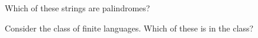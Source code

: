 \documentclass[noanswers, nolegalese, 11pt]{examjh}
\begin{document}
\begin{questions}
\question
Which of these strings are palindromes?

\question
Consider the class of finite languages.
Which of these is in the class?


\end{questions}
\end{document}
